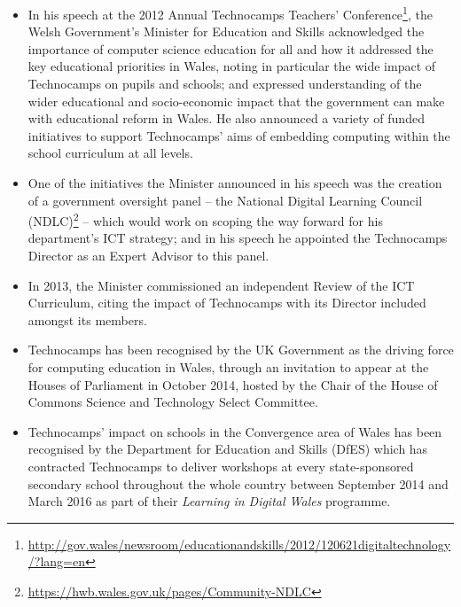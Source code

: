 \documentclass{llncs}
\begin{document}
\begin{itemize}

\item In his speech at the 2012 Annual Technocamps Teachers'
Conference\footnote{\url{http://gov.wales/newsroom/educationandskills/2012/120621digitaltechnology/?lang=en}},
the Welsh Government's Minister for Education and Skills acknowledged
the importance of computer science education for all and how it
addressed the key educational priorities in Wales, noting in
particular the wide impact of Technocamps on pupils and schools; and
expressed understanding of the wider educational and socio-economic
impact that the government can make with educational reform in
Wales. He also announced a variety of funded initiatives to support
Technocamps' aims of embedding computing within the school curriculum
at all levels.

\item One of the initiatives the Minister announced in his speech was
the creation of a government oversight panel -- the National
Digital Learning Council
(NDLC)\footnote{\url{https://hwb.wales.gov.uk/pages/Community-NDLC}}
-- which would work on scoping the way forward for his department's
ICT strategy; and in his speech he appointed the
Technocamps Director as an Expert Advisor to this panel.

\item In 2013, the Minister commissioned an independent Review of the ICT
Curriculum, citing the impact of Technocamps with its Director
included amongst its members.


\item Technocamps has been recognised by the UK Government as the driving
force for computing education in Wales, through an invitation to
appear at the Houses of Parliament in October 2014, hosted by the
Chair of the House of Commons Science and Technology Select Committee.

\item Technocamps' impact on schools in the Convergence area
of Wales has been recognised by the Department for Education and Skills (DfES)
which has contracted Technocamps to deliver workshops at every
state-sponsored secondary school throughout the whole country between
September 2014 and March 2016 as part of their \emph{Learning in
Digital Wales} programme.


\end{itemize}
\end{document}
